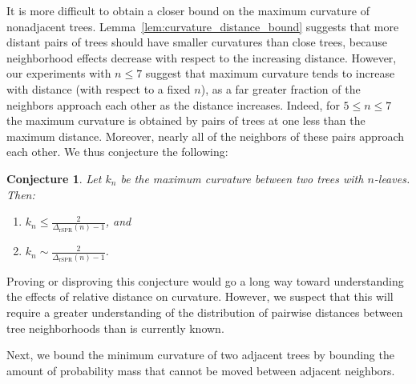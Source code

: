 \documentclass[]{elsarticle}
\newtheorem{conj}[thm]{Conjecture}
\begin{document}
It is more difficult to obtain a closer bound on the maximum curvature of nonadjacent trees.
Lemma~\ref{lem:curvature_distance_bound} suggests that more distant pairs of trees should have smaller curvatures than close trees, because neighborhood effects decrease with respect to the increasing distance.
However, our experiments with $n \le 7$ suggest that maximum curvature tends to increase with distance (with respect to a fixed $n$), as a far greater fraction of the neighbors approach each other as the distance increases.
Indeed, for $5 \le n \le 7$ the maximum curvature is obtained by pairs of trees at one less than the maximum distance.
Moreover, nearly all of the neighbors of these pairs approach each other.
We thus conjecture the following:
\begin{conj}
	Let $k_n$ be the maximum curvature between two trees with $n$-leaves.
	Then:
	\begin{enumerate}
		\item $k_n \le \frac{2}{\Delta_{\text{rSPR}}(n)-1}$, and
		\item $ k_n \sim \frac{2}{\Delta_{\text{rSPR}}(n)-1}$.
	\end{enumerate}
\end{conj}
Proving or disproving this conjecture would go a long way toward understanding the effects of relative distance on curvature.
However, we suspect that this will require a greater understanding of the distribution of pairwise distances between tree neighborhoods than is currently known.

Next, we bound the minimum curvature of two adjacent trees by bounding the amount of probability mass that cannot be moved between adjacent neighbors.
\end{document}
